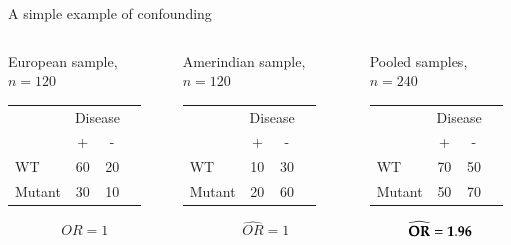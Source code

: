 \documentclass[serif,professionalfonts,svgnames]{beamer}
\begin{document}
\begin{frame}{A simple example of confounding}
\begin{columns}[c]
 \column{2.2in}
 \bigskip
\begin{block}{European sample, $n=120$}
   \small
   \begin{center}
     \colorbox{red!20}{
      \begin{tabular}{lccc}
        & \multicolumn{2}{c}{Disease} &          \\
        \cmidrule{2-3}                             
                   &         +        &               -   \\  \midrule  
        WT         &        60        &              20   \\
        Mutant     &        30        &              10
      \end{tabular}
    }
    $$\widehat{OR} = 1$$
  \end{center}
\end{block}
\vspace{-1cm}
\begin{block}{Amerindian sample, $n=120$}
  \small
  \begin{center}
  \colorbox{blue!20}{
    \begin{tabular}{lccc}
      & \multicolumn{2}{c}{Disease} &          \\
      \cmidrule{2-3}                             
                 &         +        &               -   \\  \midrule  
      WT         &        10        &              30   \\
      Mutant     &        20        &              60
    \end{tabular}
  }
  $$\widehat{OR} = 1$$
  \end{center}
 \end{block}
 \column{2.5in}
 \pause
 \begin{block}{Pooled samples, $n=240$}
   \small
   \begin{center}
     \colorbox{purple!20}{
       \begin{tabular}{lccc}
         & \multicolumn{2}{c}{Disease} &          \\
         \cmidrule{2-3}                             
                    &         +        &               -   \\  \midrule  
         WT         &        70        &              50   \\
         Mutant     &        50        &              70
       \end{tabular}
     }
   \end{center}

   $${\bf \widehat{OR} = 1.96}$$
 \end{block}
\end{columns}
\end{frame}
\end{document}
